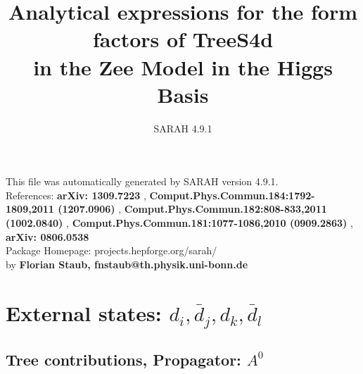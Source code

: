 \documentclass[A4,landscape]{article}
\begin{document}
\title{Analytical expressions for the form factors of TreeS4d\\ in the Zee Model in the Higgs Basis } 
 \author{SARAH 4.9.1} 
 \maketitle 
 \vspace{10cm} 
This file was automatically generated by SARAH version 4.9.1.  \\ 
References: {\bf arXiv: 1309.7223 }, {\bf Comput.Phys.Commun.184:1792-1809,2011 (1207.0906) }, {\bf Comput.Phys.Commun.182:808-833,2011 (1002.0840) }, {\bf Comput.Phys.Commun.181:1077-1086,2010 (0909.2863) }, {\bf arXiv: 0806.0538 } \\ 
Package Homepage: projects.hepforge.org/sarah/ \\ 
by {\bf Florian Staub, fnstaub@th.physik.uni-bonn.de} 
 \pagebreak 
 \tableofcontents 
 \pagebreak 
\section{External states: ${d_{{i}}, \bar{d}_{{j}}, d_{{k}}, \bar{d}_{{l}}}$} 
\subsection{Tree contributions, Propagator: $A^0$} 
\end{document}
